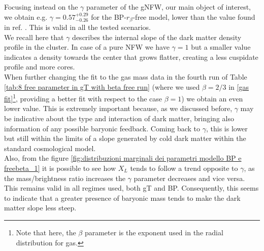 Focusing instead on the $\gamma$ parameter of the gNFW, our main object of interest, we obtain e.g. $\gamma = 0.57^{+0.29}_{-0.26}$ for the BP-$r_\beta$-free model, lower than the value found in ref. \cite{CLASH-VLT:-The-Inner-Slope-of-the-MACS-J1206.2-0847-Dark-Matter-Density-Profile}. This is valid in all the tested scenarios.\\ We recall here that $\gamma$ describes the internal slope of the dark matter density profile in the cluster.
In case of a pure NFW we have $\gamma=1$ but a smaller value indicates a density towards the center that grows flatter, creating a less cuspidate profile and more cores.\\
When further changing the fit to the gas mass data in the fourth run of Table \ref{tab:8 free parameter in gT with beta free run} (where we used $\beta = 2/3$ in \eqref{gas fit}\footnote{Note that here, the $\beta$ parameter is the exponent used in the radial distribution for gas.}, providing a better fit with respect to the case $\beta=1$) we obtain an even lower value.
This is extremely important because, as we discussed before, $\gamma$ may be indicative about the type and interaction of dark matter, bringing also information of any possible baryonic feedback.
Coming back to $\gamma$, this is lower but still within the limits of a slope generated by cold dark matter within the standard cosmological model.\\
Also, from the figure \ref{fig:distribuzioni marginali dei parametri modello BP e freebeta_1} it is possible to see how $X_L$  tends to follow a trend opposite to $\gamma$, as the mass/brightness ratio increases the $\gamma$ parameter decreases and vice versa. This remains valid in all regimes used, both gT and BP. Consequently, this seems to indicate that a greater presence of baryonic mass tends to make the dark matter slope less steep.

